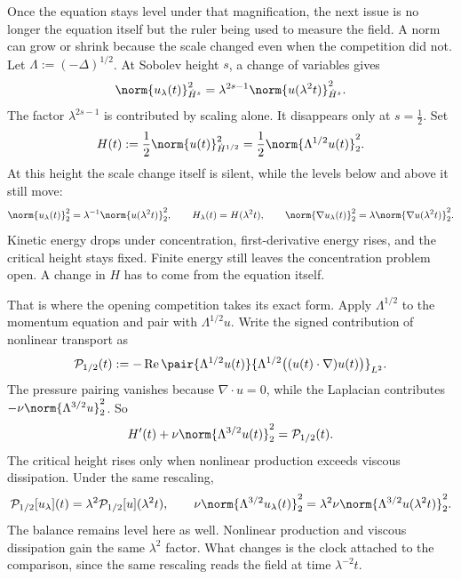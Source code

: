 Once the equation stays level under that magnification, the next issue is no longer the equation itself but the ruler being used to measure the field.
A norm can grow or shrink because the scale changed even when the competition did not.
Let \(\Lambda:=(-\Delta)^{1/2}\).
At Sobolev height \(s\), a change of variables gives
\[
  \norm{u_\lambda(t)}_{\dot H^s}^2
  =
  \lambda^{2s-1}
  \norm{u(\lambda^2t)}_{\dot H^s}^2.
\]
The factor \(\lambda^{2s-1}\) is contributed by scaling alone.
It disappears only at \(s=\tfrac12\).
Set
\[
  H(t)
  :=
  \frac12\norm{u(t)}_{\dot H^{1/2}}^2
  =
  \frac12\norm{\Lambda^{1/2}u(t)}_2^2.
\]
At this height the scale change itself is silent, while the levels below and above it still move:
\[
  \norm{u_\lambda(t)}_2^2
  =
  \lambda^{-1}\norm{u(\lambda^2t)}_2^2,
  \qquad
  H_\lambda(t)=H(\lambda^2t),
  \qquad
  \norm{\nabla u_\lambda(t)}_2^2
  =
  \lambda\norm{\nabla u(\lambda^2t)}_2^2.
\]
Kinetic energy drops under concentration, first-derivative energy rises, and the critical height stays fixed.
Finite energy still leaves the concentration problem open.
A change in \(H\) has to come from the equation itself.


That is where the opening competition takes its exact form.
Apply \(\Lambda^{1/2}\) to the momentum equation and pair with \(\Lambda^{1/2}u\).
Write the signed contribution of nonlinear transport as
\[
  \mathcal P_{1/2}(t)
  :=
  -\operatorname{Re}
  \pair
    {\Lambda^{1/2}u(t)}
    {\Lambda^{1/2}\bigl((u(t)\cdot\nabla)u(t)\bigr)}_{L^2}.
\]
The pressure pairing vanishes because \(\nabla\cdot u=0\), while the Laplacian contributes \(-\nu\norm{\Lambda^{3/2}u}_2^2\).
So
\[
  H'(t)
  +
  \nu\norm{\Lambda^{3/2}u(t)}_2^2
  =
  \mathcal P_{1/2}(t).
\]
The critical height rises only when nonlinear production exceeds viscous dissipation.
Under the same rescaling,
\[
  \mathcal P_{1/2}[u_\lambda](t)
  =
  \lambda^2\mathcal P_{1/2}[u](\lambda^2t),
  \qquad
  \nu\norm{\Lambda^{3/2}u_\lambda(t)}_2^2
  =
  \lambda^2\nu\norm{\Lambda^{3/2}u(\lambda^2t)}_2^2.
\]
The balance remains level here as well.
Nonlinear production and viscous dissipation gain the same \(\lambda^2\) factor.
What changes is the clock attached to the comparison, since the same rescaling reads the field at time \(\lambda^{-2}t\).


